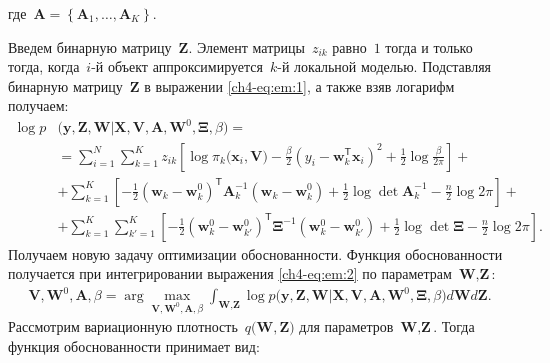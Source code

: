  где~$\mathbf{A} = \left\{\mathbf{A}_1, \ldots, \mathbf{A}_K\right\}.$
 
Введем бинарную матрицу~$\mathbf{Z}$. Элемент матрицы~$z_{ik}$ равно~$1$ тогда и только тогда, когда~$i$-й объект аппроксимируется~$k$-й локальной моделью.
Подставляя бинарную матрицу~$\mathbf{Z}$ в выражении \eqref{ch4-eq:em:1}, а также взяв логарифм получаем:
\[
\label{ch4-eq:em:2}
\begin{aligned}
\log p&\bigr(\mathbf{y}, \mathbf{Z}, \mathbf{W}|\mathbf{X}, \mathbf{V}, \textbf{A}, \textbf{W}^{0},  \bm{\Xi}, \beta\bigr) =\\
& = \sum_{i=1}^{N}\sum_{k=1}^{K}z_{ik}\left[\log\pi_k\bigr(\textbf{x}_i, \textbf{V}\bigr) - \frac{\beta}{2}\left(y_{i} - \textbf{w}_{k}^{\mathsf{T}}\textbf{x}_{i}\right)^{2} + \frac{1}{2}\log\frac{\beta}{2\pi}\right] +\\
&+ \sum_{k=1}^{K}\left[-\frac{1}{2}\left(\textbf{w}_{k} - \textbf{w}_{k}^{0}\right)^{\mathsf{T}}\textbf{A}_{k}^{-1}\left(\textbf{w}_{k} - \textbf{w}_{k}^{0}\right) + \frac{1}{2}\log\det\textbf{A}^{-1}_{k} - \frac{n}{2}\log2\pi\right]+\\
&+ \sum_{k=1}^{K}\sum_{k'=1}^{K}\left[-\frac{1}{2}\left(\textbf{w}_{k}^{0}-\textbf{w}_{k'}^{0}\right)^{\mathsf{T}}\bm{\Xi}^{-1}\left(\textbf{w}_{k}^{0}-\textbf{w}_{k'}^{0}\right) +\frac{1}{2}\log\det \bm{\Xi} -\frac{n}{2}\log{2\pi}\right].
\end{aligned}
\]
Получаем новую задачу оптимизации обоснованности. Функция обоснованности получается при интегрировании выражения \eqref{ch4-eq:em:2} по параметрам~$\textbf{W}, \textbf{Z}$:
\[
\label{ch4-eq:em:3}
\begin{aligned}
\mathbf{V}, \mathbf{W}^0, \textbf{A},  \beta = \arg\max_{\mathbf{V}, \mathbf{W}^0, \textbf{A}, \beta} \int_{\textbf{W}, \textbf{Z}}\log p\bigr(\mathbf{y}, \textbf{Z}, \textbf{W}|\mathbf{X}, \mathbf{V}, \textbf{A}, \textbf{W}^{0}, \bm{\Xi}, \beta\bigr)d\textbf{W}d\textbf{Z}.
\end{aligned}
\]
Рассмотрим вариационную плотность~$q\bigr(\textbf{W}, \textbf{Z}\bigr)$ для параметров~$\textbf{W}, \textbf{Z}$. Тогда функция обоснованности принимает вид:
